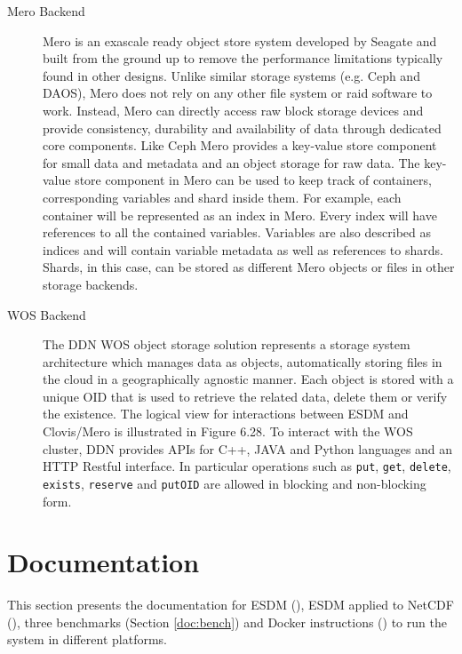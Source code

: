 \begin{description}
\item[Mero Backend]

Mero is an exascale ready object store system developed by Seagate and built from the
ground up to remove the performance limitations typically found in other designs. Unlike
similar storage systems (e.g. Ceph and DAOS), Mero does not rely on any other file system
or raid software to work. Instead, Mero can directly access raw block storage devices and
provide consistency, durability and availability of data through dedicated core components.
Like Ceph Mero provides a key-value store component for small data and metadata and an
object storage for raw data.
The key-value store component in Mero can be used to keep track of containers, corresponding
variables and shard inside them. For example, each container will be represented as
an index in Mero. Every index will have references to all the contained variables. Variables are
also described as indices and will contain variable metadata as well as references to shards.
Shards, in this case, can be stored as different Mero objects or files in other storage backends.

\item[WOS Backend]

The DDN WOS object storage solution represents a storage system architecture
which manages data as objects, automatically storing files in the cloud in a
geographically agnostic manner. Each object is stored with a unique OID that is used to retrieve the
related data, delete them or verify the existence. The logical view for interactions between ESDM and Clovis/Mero is illustrated in Figure 6.28.
To interact with the WOS cluster, DDN provides APIs for C++, JAVA and Python languages and an HTTP Restful interface. In particular operations such as \texttt{put}, \texttt{get}, \texttt{delete},
\texttt{exists}, \texttt{reserve} and \texttt{putOID} are allowed in blocking and non-blocking form.

\end{description}

\section{Documentation}

\tab
This section presents the documentation for ESDM (), ESDM applied to NetCDF (), three benchmarks (Section \ref{doc:bench}) and Docker instructions () to run the system in different platforms.

